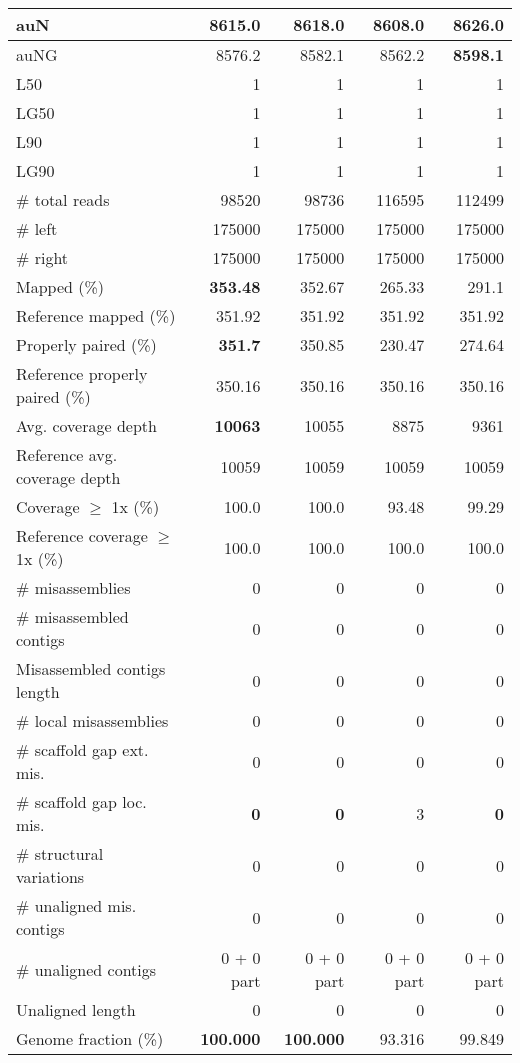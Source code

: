 \documentclass[12pt,a4paper]{article}
\begin{document}
\begin{table}[ht]
\begin{center}
\begin{tabular}{|l*{4}{|r}|}
auN & 8615.0 & 8618.0 & 8608.0 & {\bf 8626.0} \\ \hline
auNG & 8576.2 & 8582.1 & 8562.2 & {\bf 8598.1} \\ \hline
L50 & 1 & 1 & 1 & 1 \\ \hline
LG50 & 1 & 1 & 1 & 1 \\ \hline
L90 & 1 & 1 & 1 & 1 \\ \hline
LG90 & 1 & 1 & 1 & 1 \\ \hline
\# total reads & 98520 & 98736 & 116595 & 112499 \\ \hline
\# left & 175000 & 175000 & 175000 & 175000 \\ \hline
\# right & 175000 & 175000 & 175000 & 175000 \\ \hline
Mapped (\%) & {\bf 353.48} & 352.67 & 265.33 & 291.1 \\ \hline
Reference mapped (\%) & 351.92 & 351.92 & 351.92 & 351.92 \\ \hline
Properly paired (\%) & {\bf 351.7} & 350.85 & 230.47 & 274.64 \\ \hline
Reference properly paired (\%) & 350.16 & 350.16 & 350.16 & 350.16 \\ \hline
Avg. coverage depth & {\bf 10063} & 10055 & 8875 & 9361 \\ \hline
Reference avg. coverage depth & 10059 & 10059 & 10059 & 10059 \\ \hline
Coverage $\geq$ 1x (\%) & 100.0 & 100.0 & 93.48 & 99.29 \\ \hline
Reference coverage $\geq$ 1x (\%) & 100.0 & 100.0 & 100.0 & 100.0 \\ \hline
\# misassemblies & 0 & 0 & 0 & 0 \\ \hline
\# misassembled contigs & 0 & 0 & 0 & 0 \\ \hline
Misassembled contigs length & 0 & 0 & 0 & 0 \\ \hline
\# local misassemblies & 0 & 0 & 0 & 0 \\ \hline
\# scaffold gap ext. mis. & 0 & 0 & 0 & 0 \\ \hline
\# scaffold gap loc. mis. & {\bf 0} & {\bf 0} & 3 & {\bf 0} \\ \hline
\# structural variations & 0 & 0 & 0 & 0 \\ \hline
\# unaligned mis. contigs & 0 & 0 & 0 & 0 \\ \hline
\# unaligned contigs & 0 + 0 part & 0 + 0 part & 0 + 0 part & 0 + 0 part \\ \hline
Unaligned length & 0 & 0 & 0 & 0 \\ \hline
Genome fraction (\%) & {\bf 100.000} & {\bf 100.000} & 93.316 & 99.849 \\ \hline

\end{tabular}
\end{center}
\end{table}
\end{document}

